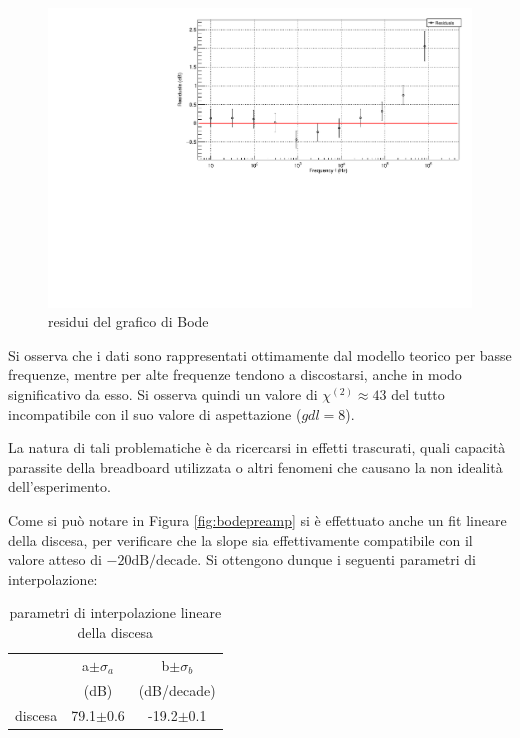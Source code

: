 \documentclass{article}
\begin{document}
\begin{center}
    \begin{figure}[H]
    \centering
    \includegraphics[scale=0.4, angle=0]{bodepreampresidui.pdf}
    \caption{residui del grafico di Bode}
    \label{fig:bodepreamp_res}
    \end{figure}
\end{center}

Si osserva che i dati sono rappresentati ottimamente dal modello teorico per basse
frequenze, mentre per alte frequenze tendono a discostarsi, anche in modo 
significativo da esso. Si osserva quindi un valore di $\chi^{(2)} \approx 43$ del tutto 
incompatibile con il suo valore di aspettazione ($gdl = 8$). 

La natura di tali problematiche è da ricercarsi in effetti trascurati, quali capacità parassite della breadboard utilizzata o
altri fenomeni che causano la non idealità dell'esperimento.

Come si può notare in Figura \ref{fig:bodepreamp} si è effettuato anche un
fit lineare della discesa, per verificare che la slope sia effettivamente
compatibile con il valore atteso di $-20 \text{dB}/\text{decade}$. Si ottengono
dunque i seguenti parametri di interpolazione:

\begin{table}[ht]
    \centering
    \begin{tabular}{rcccc}
        \toprule
                &\multicolumn{2}{c}{a$\pm \sigma_a$} &\multicolumn{2}{c}{b$\pm \sigma_b$}\\
                &\multicolumn{2}{c}{(dB)}  &\multicolumn{2}{c}{(dB/decade)}\\
        \midrule
        discesa &\multicolumn{2}{c}{79.1$\pm$0.6}&\multicolumn{2}{c}{-19.2$\pm$0.1}\\
        \bottomrule
    \end{tabular}
    \caption{parametri di interpolazione lineare della discesa}
\end{table}
\end{document}
